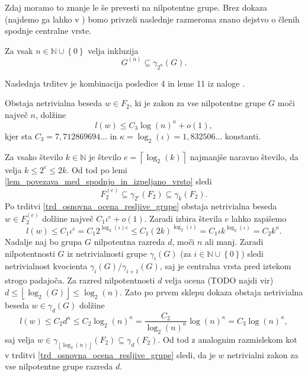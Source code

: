 Zdaj moramo to znanje le še prevesti na nilpotentne grupe. Brez dokaza (najdemo ga lahko v \cite[str.~17--18]{Schneider}) bomo privzeli naslednje razmeroma znano dejstvo o členih
spodnje centralne vrste. 

\begin{lema}
\label{lem_povezava_med_spodnjo_in_izpeljano_vrsto}
Za vsak $n \in \mathbb{N} \cup \left\{ 0\right\} $ velja inkluzija
\begin{equation*}
G^{(n)} \subseteq \gamma_{2^{n}}(G).
\end{equation*}    
\end{lema}

Naslednja trditev je kombinacija posledice 4 in leme 11 iz naloge \cite{Schneider_2016}.

\begin{trditev}
\label{trd_koncna_ugotovitev_nilpotentne_v_nalogi}
 Obstaja netrivialna beseda $w \in F_2$, ki je zakon za vse nilpotentne grupe $G$ moči največ $n$, dolžine \begin{equation*}
 l(w) \le  C_3 \log(n)^{\kappa} + o(1),
 \end{equation*}  
 kjer sta $C_3 = 7{,}712869694 \ldots$ in $\kappa = \log_2(\iota) = 1{,}832506 \ldots$ konstanti.    
\end{trditev}

\begin{dokaz}
    Za vsako število $k \in  \mathbb{N}$ je
    število $e = \left\lceil \log_2(k) \right\rceil$ najmanjše naravno število, da velja $k \le 2^{e} \le 2k$.
    Od tod po lemi \ref{lem_povezava_med_spodnjo_in_izpeljano_vrsto} sledi \begin{equation*}
    F_2^{(e)} \subseteq \gamma_{2^{e}}(F_2) \subseteq \gamma_k(F_2).
    \end{equation*}  
     Po trditvi \ref{trd_osnovna_ocena_resljive_grupe} obstaja netrivialna beseda $w \in  F_2^{(e)}$ dolžine največ $C_1 \iota^{e} + o(1)$.
    Zaradi izbira števila $e$ lahko zapišemo \begin{equation*}
    l(w) \le  C_1 \iota^{e} = C_1 2^{\log_2(\iota) e} \le C_1 (2k)^{\log_2(\iota)} = C_1 \iota k^{\log_2(\iota)} = C_2  k^\kappa.
    \end{equation*}
    Nadalje naj bo grupa $G$ nilpotentna razreda $d$, moči $n$ ali manj. Zaradi nilpotentnosti $G$ iz netrivialnosti grupe $\gamma_i(G)$ (za $i \in \mathbb{N} \cup \left\{ 0 \right\}$) sledi netrivialnost kvocienta $\gamma_i(G) / \gamma_{i + 1}(G)$, saj je centralna vrsta pred iztekom strogo padajoča.
    Za razred nilpotentnosti $d$ velja ocena (TODO najdi vir) $d \le \left\lfloor \log_2(G)  \right\rfloor \le \log_2(n)$. Zato po prvem sklepu dokaza obstaja netrivialna beseda $w \in \gamma_d(G)$ dolžine \begin{equation*}
    l(w) \le C_2 d^{\kappa} \le C_2 \log_2(n)^{\kappa} = \frac{C_2}{\log_2(n)^{\kappa}} \log(n)^{\kappa} = C_3 \log(n)^{\kappa}, 
    \end{equation*}  
     saj velja $w \in \gamma_{\left\lfloor \log_2(n) \right\rfloor}(F_2) \subseteq \gamma_{d}(F_2)$. Od tod z analognim razmislekom kot v trditvi \ref{trd_osnovna_ocena_resljive_grupe} sledi, da je $w$ netrivialni zakon za vse nilpotentne grupe razreda $d$. 
\end{dokaz}

